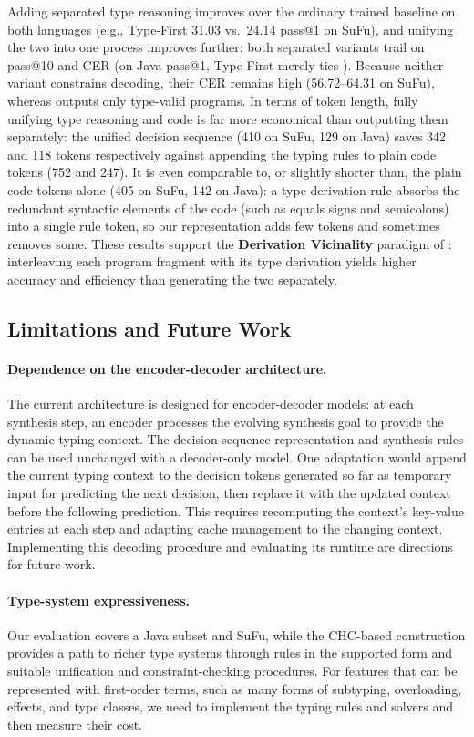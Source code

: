 Adding separated type reasoning improves over the ordinary trained baseline on both languages (e.g., Type-First 31.03 vs.\ 24.14 pass@1 on SuFu), and unifying the two into one process improves further: both separated variants trail \mainname{} on pass@10 and CER (on Java pass@1, Type-First merely ties \mainname{}).
Because neither variant constrains decoding, their CER remains high (56.72--64.31 on SuFu), whereas \mainname{} outputs only type-valid programs.
In terms of token length, fully unifying type reasoning and code is far more economical than outputting them separately: the unified decision sequence (410 on SuFu, 129 on Java) saves 342 and 118 tokens respectively against appending the typing rules to plain code tokens (752 and 247).
It is even comparable to, or slightly shorter than, the plain code tokens alone (405 on SuFu, 142 on Java): a type derivation rule absorbs the redundant syntactic elements of the code (such as equals signs and semicolons) into a single rule token, so our representation adds few tokens and sometimes removes some.
These results support the \textbf{Derivation Vicinality} paradigm of \mainname: interleaving each program fragment with its type derivation yields higher accuracy and efficiency than generating the two separately.

\subsection{Limitations and Future Work} \label{sec:limitations}
\paragraph{Dependence on the encoder-decoder architecture.}
The current architecture is designed for encoder-decoder models: at each synthesis step, an encoder processes the evolving synthesis goal to provide the dynamic typing context.
The decision-sequence representation and synthesis rules can be used unchanged with a decoder-only model. One adaptation would append the current typing context to the decision tokens generated so far as temporary input for predicting the next decision, then replace it with the updated context before the following prediction. This requires recomputing the context's key-value entries at each step and adapting cache management to the changing context. Implementing this decoding procedure and evaluating its runtime are directions for future work.

\paragraph{Type-system expressiveness.}
Our evaluation covers a Java subset and SuFu, while the CHC-based construction provides a path to richer type systems through rules in the supported form and suitable unification and constraint-checking procedures. For features that can be represented with first-order terms, such as many forms of subtyping, overloading, effects, and type classes, we need to implement the typing rules and solvers and then measure their cost.

